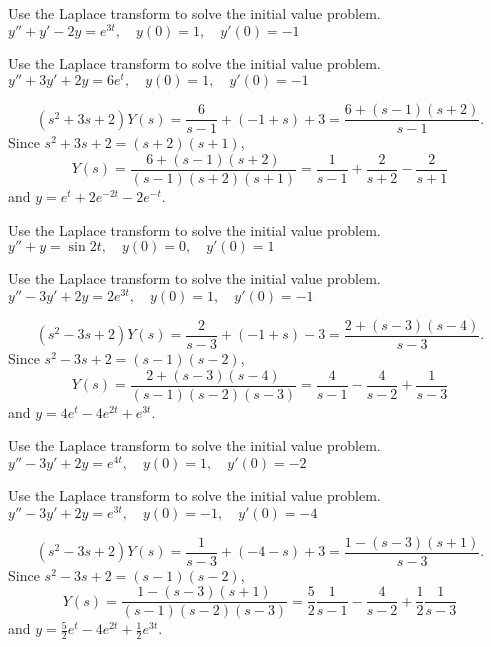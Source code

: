 \documentclass{ximera}
\begin{document}
\begin{problem}\label{exer:8.3.5} Use the Laplace transform to solve the initial value problem. $y''+y'-2y=e^{3t}, \quad  y(0)=1,\quad y'(0)=-1$
\end{problem}

\begin{problem}\label{exer:8.3.6} Use the Laplace transform to solve the initial value problem. $y''+3y'+2y=6e^t, \quad  y(0)=1,\quad y'(0)=-1$

\begin{solution}
$$
(s^2+3s+2)Y(s)=\frac{6}{s-1}+(-1+s)+3=\frac{6+(s-1)(s+2)}{s-1}.
$$
Since $s^2+3s+2=(s+2)(s+1)$,
$$
Y(s)=\frac{6+(s-1)(s+2)}{(s-1)(s+2)(s+1)}=
\frac{1}{s-1}+\frac{2}{s+2}-\frac{2}{s+1}
$$
and
 $y=e^t+2e^{-2t}-2e^{-t}$.
\end{solution}
\end{problem}

\begin{problem}\label{exer:8.3.7} Use the Laplace transform to solve the initial value problem. $y''+y=\sin2t, \quad  y(0)=0,\quad y'(0)=1$
\end{problem}

\begin{problem}\label{exer:8.3.8} Use the Laplace transform to solve the initial value problem. $y''-3y'+2y=2e^{3t}, \quad  y(0)=1,\quad y'(0)=-1$

\begin{solution}
$$
 (s^2-3s+2)Y(s)=\frac{2}{s-3}+(-1+s)-3=\frac{2+(s-3)(s-4)}{s-3}.
$$
Since $s^2-3s+2=(s-1)(s-2)$,
$$
Y(s)=\frac{2+(s-3)(s-4)}{(s-1)(s-2)(s-3)}=
\frac{4}{s-1}-\frac{4}{s-2}+\frac{1}{s-3}
$$
and
  $y=4e^t-4e^{2t}+e^{3t}$.
\end{solution}
\end{problem}

\begin{problem}\label{exer:8.3.9} Use the Laplace transform to solve the initial value problem. $y''-3y'+2y=e^{4t}, \quad  y(0)=1,\quad y'(0)=-2$
\end{problem}

\begin{problem}\label{exer:8.3.10} Use the Laplace transform to solve the initial value problem. $y''-3y'+2y=e^{3t}, \quad  y(0)=-1,\quad y'(0)=-4$

\begin{solution}
$$
(s^2-3s+2)Y(s)=\frac{1}{s-3}+(-4-s)+3=\frac{1-(s-3)(s+1)}{s-3}.
$$
Since $s^2-3s+2=(s-1)(s-2)$,
$$
Y(s)=\frac{1-(s-3)(s+1)}{(s-1)(s-2)(s-3)}=
\frac{5}{2}\frac{1}{s-1}-\frac{4}{s-2}+\frac{1}{2}\frac{1}{s-3}
$$
and
  $y=\frac{5}{2}e^t-4e^{2t}+\frac{1}{2}e^{3t}$.
\end{solution}
\end{problem}
\end{document}
